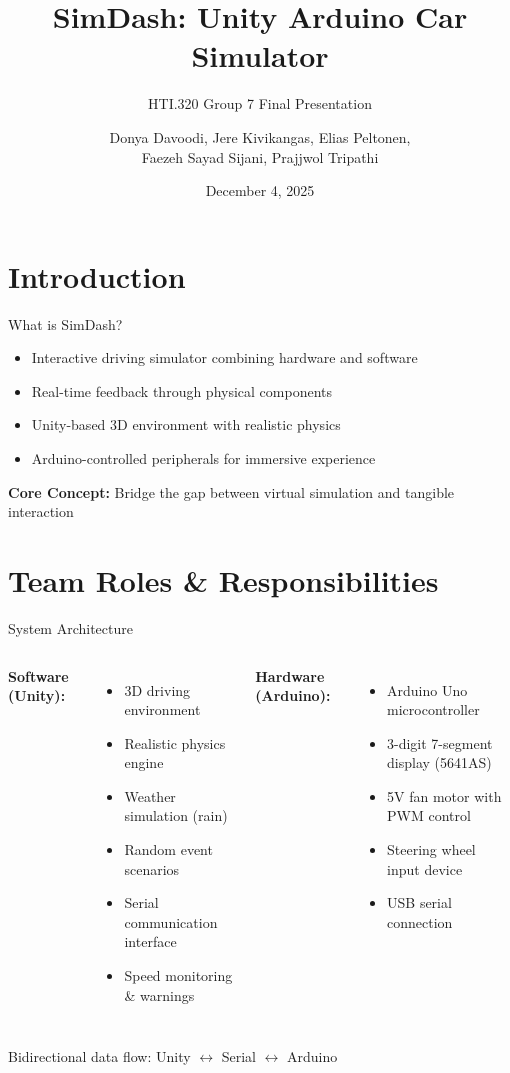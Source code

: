 \documentclass[aspectratio=169]{beamer}
\title{SimDash: Unity Arduino Car Simulator}
\subtitle{HTI.320 Group 7 Final Presentation}
\author{Donya Davoodi, Jere Kivikangas, Elias Peltonen,\\Faezeh Sayad Sijani, Prajjwol Tripathi}
\institute{Tampere University}
\date{December 4, 2025}
\newenvironment{tlist}{\begin{itemize}}{\end{itemize}}
\begin{document}
\maketitle

\section{Introduction}

\begin{frame}{What is SimDash?}
\begin{tlist}
    \item Interactive driving simulator combining \alert{hardware} and \alert{software}
    \item Real-time feedback through physical components
    \item Unity-based 3D environment with realistic physics
    \item Arduino-controlled peripherals for immersive experience
\end{tlist}

\vspace{0.5cm}
\textbf{Core Concept:} Bridge the gap between virtual simulation and tangible interaction
\end{frame}

\section{Team Roles \& Responsibilities}

\begin{frame}{System Architecture}
\begin{columns}[T]
\textbf{Software (Unity):}
\begin{tlist}
    \item 3D driving environment
    \item Realistic physics engine
    \item Weather simulation (rain)
    \item Random event scenarios
    \item Serial communication interface
    \item Speed monitoring \& warnings
\end{tlist}

\textbf{Hardware (Arduino):}
\begin{tlist}
    \item Arduino Uno microcontroller
    \item 3-digit 7-segment display (5641AS)
    \item 5V fan motor with PWM control
    \item Steering wheel input device
    \item USB serial connection
\end{tlist}
\end{columns}

\vspace{0.3cm}
\centering
\alert{Bidirectional data flow: Unity $\leftrightarrow$ Serial $\leftrightarrow$ Arduino}
\end{frame}
\end{document}
